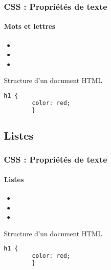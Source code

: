 \documentclass[xcolor=table]{beamer}
\begin{document}
\begin{frame}[fragile]
\frametitle{CSS : Propriétés de texte}
\framesubtitle{Mots et lettres}

\begin{minipage}{0.60\textwidth}
	\begin{itemize}
		\item {}
		\item {}
		\item {}
	\end{itemize}
\end{minipage}
%
\begin{minipage}{0.38\textwidth}
	\begin{block}{Structure d'un document HTML}
		\lstset{escapeinside=**}
		\scriptsize\bfseries
		\begin{lstlisting}[language={html}]
		h1 {
		color: red;
		}
		\end{lstlisting}
	\end{block}
\end{minipage}
\end{frame}

\subsection{Listes}

\begin{frame}[fragile]
\frametitle{CSS : Propriétés de texte}
\framesubtitle{Listes}

\begin{minipage}{0.60\textwidth}
	\begin{itemize}
		\item {}
		\item {}
		\item {}
	\end{itemize}
\end{minipage}
%
\begin{minipage}{0.38\textwidth}
	\begin{block}{Structure d'un document HTML}
		\lstset{escapeinside=**}
		\scriptsize\bfseries
		\begin{lstlisting}[language={html}]
		h1 {
		color: red;
		}
		\end{lstlisting}
	\end{block}
\end{minipage}
\end{frame}
\end{document}
